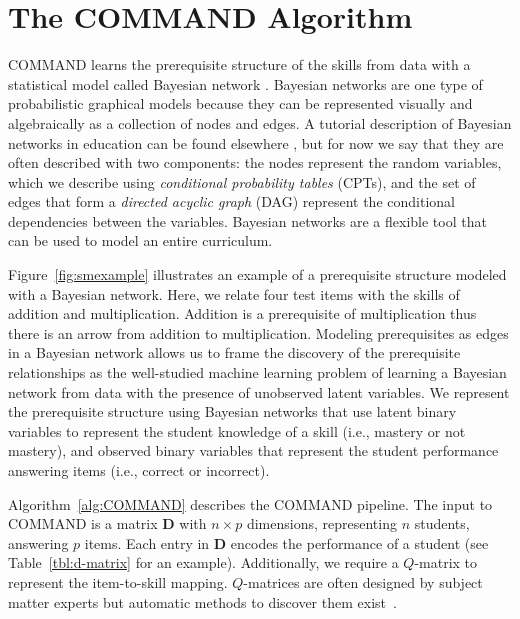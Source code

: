 \documentclass{edm_template}
\begin{document}
\newpage
\section{The COMMAND Algorithm}
\label{sec:pre_pipeline}
COMMAND learns the prerequisite structure of the skills from data with a statistical model called Bayesian network \cite{pearl1988probabilistic,spirtes2001causation}.
Bayesian networks are one type of probabilistic graphical models because they can be represented visually and algebraically as a collection of nodes and edges.
A tutorial description of Bayesian networks in education can be found elsewhere \cite{mislevy1999bayes}, 
but for now we say that they are often described with two components: 
the  nodes represent the random variables, which we describe using \textit{conditional probability tables} (CPTs),
and the set of edges that form a \textit{directed acyclic graph} (DAG) represent the conditional dependencies between the variables.
Bayesian networks are a flexible tool that can be used to model an entire curriculum.

Figure~\ref{fig:smexample} illustrates an example of a prerequisite structure modeled with a Bayesian network.
Here, we relate four test items with the skills of addition and multiplication.
Addition is a prerequisite of multiplication thus there is an arrow from addition to multiplication.
Modeling prerequisites as edges in a Bayesian network allows us to frame the discovery of the prerequisite relationships as the well-studied machine learning problem of
learning a Bayesian network from data with the presence of unobserved latent variables.
We represent the prerequisite structure using Bayesian networks that use latent binary variables to represent the student knowledge of a skill (i.e., mastery or not mastery), 
and observed binary variables that represent the student performance answering items (i.e., correct or incorrect).


Algorithm~\ref{alg:COMMAND} describes the COMMAND pipeline.
The input to COMMAND is a  matrix $\mathbf{D}$ with $n \times p$ dimensions,
representing $n$ students, answering $p$ items.
Each entry in $\mathbf{D}$ encodes the performance of a student (see Table~\ref{tbl:d-matrix} for an example).
Additionally, we require a $Q$-matrix to represent the item-to-skill mapping.
$Q$-matrices are often designed by subject matter experts but automatic methods to discover them exist~\cite{jp_aistats_2015}.
\end{document}
